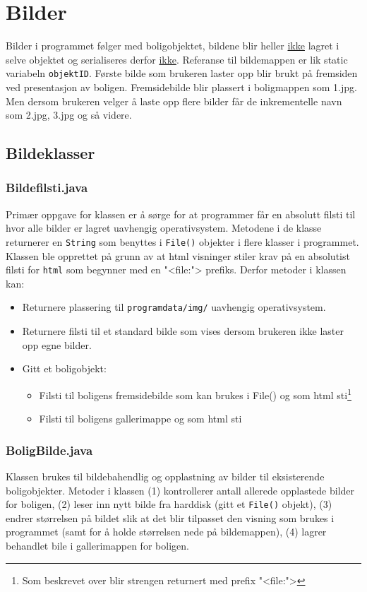\section{Bilder} \label{sec:bilder}
Bilder i programmet følger med boligobjektet, bildene blir heller \underline{ikke} lagret i selve objektet og serialiseres derfor \underline{ikke}. Referanse til bildemappen er lik static variabeln \texttt{objektID}. Første bilde som brukeren laster opp blir brukt på fremsiden ved presentasjon av boligen. Fremsidebilde blir plassert i boligmappen som 1.jpg. Men dersom brukeren velger å laste opp flere bilder får de inkrementelle navn som 2.jpg, 3.jpg og så videre. 

\subsection{Bildeklasser}
\subsubsection*{Bildefilsti.java}
Primær oppgave for klassen er å sørge for at programmer får en absolutt filsti til hvor alle bilder er lagret uavhengig operativsystem. Metodene i de klasse returnerer en \texttt{String} som benyttes i \texttt{File()} objekter i flere klasser i programmet.  
Klassen ble opprettet på grunn av at html visninger stiler krav på en absolutist filsti for \texttt{html} som begynner med en "<file:"> prefiks. 
Derfor metoder i klassen kan: 
\begin{itemize}[noitemsep,nolistsep]
\item Returnere plassering til \texttt{programdata/img/} uavhengig operativsystem.
\item Returnere filsti til et standard bilde som vises dersom brukeren ikke laster opp egne bilder.
\item Gitt et boligobjekt:
\begin{itemize}
\item Filsti til boligens fremsidebilde som kan brukes i File() og som html sti\footnote{Som beskrevet over blir strengen returnert med prefix "<file:">}
\item Filsti til boligens gallerimappe og som html sti
\end{itemize}
\end{itemize}

\subsubsection*{BoligBilde.java}
Klassen brukes til bildebahendlig og opplastning av bilder til eksisterende boligobjekter. Metoder i klassen (1) kontrollerer antall allerede opplastede bilder for boligen, (2) leser inn nytt bilde fra harddisk (gitt et \texttt{File()} objekt), (3) endrer størrelsen på bildet slik at det blir tilpasset den visning som brukes i programmet (samt for å holde størrelsen nede på bildemappen), (4) lagrer behandlet bile i gallerimappen for boligen.

